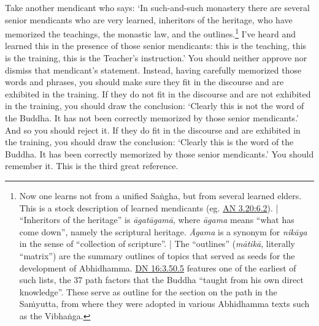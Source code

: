 \documentclass[12pt,openany]{book}%
\begin{document}
Take another mendicant who says: ‘In such-and-such monastery there are several senior mendicants who are very learned, inheritors of the heritage, who have memorized the teachings, the monastic law, and the outlines.\footnote{Now one learns not from a unified \textsanskrit{Saṅgha}, but from several learned elders. This is a stock description of learned mendicants (eg. \href{https://suttacentral.net/an3.20/en/sujato\#6.2}{AN 3.20:6.2}). | “Inheritors of the heritage” is \textit{\textsanskrit{āgatāgamā}}, where \textit{\textsanskrit{āgama}} means “what has come down”, namely the scriptural heritage. \textit{Āgama} is a synonym for \textit{\textsanskrit{nikāya}} in the sense of “collection of scripture”. | The “outlines” (\textit{\textsanskrit{mātikā}}, literally “matrix”) are the summary outlines of topics that served as seeds for the development of Abhidhamma. \href{https://suttacentral.net/dn16/en/sujato\#3.50.5}{DN 16:3.50.5} features one of the earliest of such lists, the 37 path factors that the Buddha “taught from his own direct knowledge”. These serve as outline for the section on the path in the \textsanskrit{Saṁyutta}, from where they were adopted in various Abhidhamma texts such as the \textsanskrit{Vibhaṅga}. } I’ve heard and learned this in the presence of those senior mendicants: this is the teaching, this is the training, this is the Teacher’s instruction.’ You should neither approve nor dismiss that mendicant’s statement. Instead, having carefully memorized those words and phrases, you should make sure they fit in the discourse and are exhibited in the training. If they do not fit in the discourse and are not exhibited in the training, you should draw the conclusion: ‘Clearly this is not the word of the Buddha. It has not been correctly memorized by those senior mendicants.’ And so you should reject it. If they do fit in the discourse and are exhibited in the training, you should draw the conclusion: ‘Clearly this is the word of the Buddha. It has been correctly memorized by those senior mendicants.’ You should remember it. This is the third great reference. 
\end{document}
